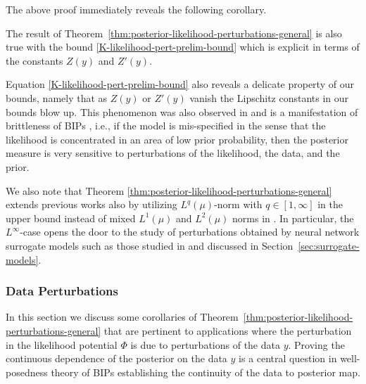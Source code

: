 \documentclass[final]{siamart171218}
\begin{document}
The above proof immediately reveals the following corollary.

      
      
\begin{corollary}\label{cor:posterior-likelihood-perturbations-general}
        The result of Theorem~\ref{thm:posterior-likelihood-perturbations-general} is also 
        true with the bound \eqref{K-likelihood-pert-prelim-bound} which is 
        explicit in terms of the constants $Z(y)$ and $Z'(y)$.
\end{corollary}

\begin{remark}\label{rem:brittleness}
Equation \eqref{K-likelihood-pert-prelim-bound} also reveals a delicate property of 
our bounds, namely that as $Z(y)$ or $Z'(y)$ vanish the Lipschitz constants in our 
bounds blow up. This phenomenon 
was also observed in \cite{sprungk} and is a manifestation of brittleness of BIPs
\cite{owhadi2015brittleness, owhadi2016brittleness, owhadi2015brittleness-b}, i.e., if the model is mis-specified in the sense that the 
likelihood is concentrated in an area of low prior probability, then 
the posterior measure is very sensitive to perturbations of the likelihood, the data, 
and the prior. 
\end{remark}

We also note that Theorem %
\ref{thm:posterior-likelihood-perturbations-general} extends previous works also by utilizing $L^q(\mu)$-norm with $q\in [1,\infty]$ in the upper bound instead of mixed $L^1(\mu)$ and $L^2(\mu)$ norms in \cite{sprungk}. In particular, the $L^\infty$-case opens the door to the study of perturbations obtained by neural network surrogate models such as those studied in \cite{herrmann2020deep} and discussed in Section~\ref{sec:surrogate-models}.


\subsubsection{Data Perturbations}\label{sec:data-perturbation}
In this section we discuss some corollaries of Theorem~\ref{thm:posterior-likelihood-perturbations-general}
that are pertinent to applications where the perturbation in the likelihood
potential $\Phi$ is due to perturbations of the data $y$. Proving the continuous dependence of the
posterior on the data $y$ is a central question in  well-posedness theory of BIPs
\cite{stuart-acta-numerica,hosseini-convex,hosseini-sparse,sullivan} establishing
the continuity of the data to posterior  map.
\end{document}
